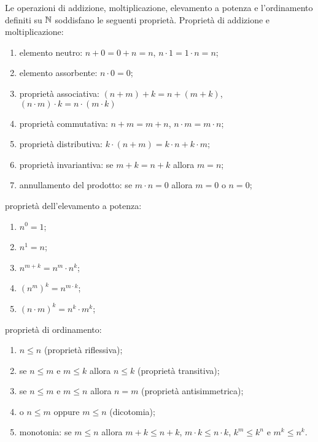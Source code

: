 \begin{theorem}
\label{th:operazioni_naturali}%
%
%
Le operazioni di addizione, moltiplicazione, elevamento a potenza 
e l'ordinamento definiti su ${\mathbb N}$
soddisfano le seguenti proprietà.
Proprietà di addizione e moltiplicazione:
\begin{enumerate}
    \item elemento neutro:
      $n + 0 = 0 + n = n$,
      $n\cdot 1 = 1\cdot n = n$;
    \item elemento assorbente:
      $n\cdot 0 = 0$;
    \item proprietà associativa: 
      $(n+m)+k = n+(m+k)$, $(n\cdot m)\cdot k = n \cdot (m\cdot k)$
    \item proprietà commutativa: 
      $n+m = m+n$, $n\cdot m = m\cdot n$;
    \item proprietà distributiva:
     $k\cdot (n+m) = k\cdot n + k\cdot m$;
    \item proprietà invariantiva:
     se $m+k = n+k$ allora $m=n$;
    \item annullamento del prodotto: se $m\cdot n=0$ allora $m=0$ o $n=0$;
\end{enumerate}
proprietà dell'elevamento a potenza:
\begin{enumerate}
  \item $n^0 = 1$;
  \item $n^1 = n$;
  \item $n^{m+k} = n^m \cdot n^k$;
  \item $(n^m)^k = n^{m\cdot k}$;
  \item $(n\cdot m)^k = n^k \cdot m^k$;
\end{enumerate}
proprietà di ordinamento:
\begin{enumerate}
  \item $n\le n$ (proprietà riflessiva);
  \item se $n\le m$ e $m\le k$ allora $n\le k$ (proprietà transitiva);
  \item se $n\le m$ e $m\le n$ allora $n=m$ (proprietà antisimmetrica);
  \item o $n\le m$ oppure $m\le n$ (dicotomia);
  \item monotonia:
   se $m\le n$ allora 
   $m+k\le n+k$, $m\cdot k \le n\cdot k$,
   $k^m \le k^n$ e $m^k \le n^k$. 
\end{enumerate}
\end{theorem}
%
